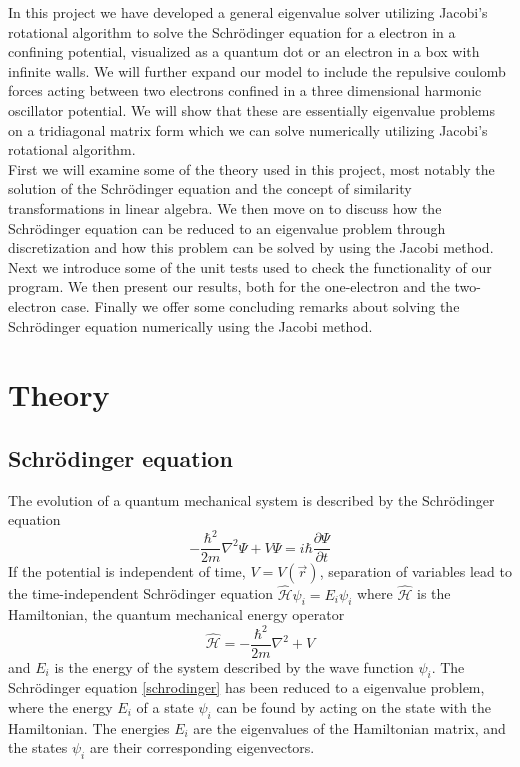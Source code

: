 \documentclass[12pt]{article}
\numberwithin{figure}{section}
\numberwithin{table}{section}
\begin{document}
\noindent In this project we have developed a general eigenvalue solver utilizing Jacobi's rotational algorithm to solve the Schrödinger equation for a electron in a confining potential, visualized as a quantum dot or an electron in a box with infinite walls. We will further expand our model to include the repulsive coulomb forces acting between two electrons confined in a three dimensional harmonic oscillator potential. We will show that these are essentially eigenvalue problems on a tridiagonal matrix form which we can solve numerically utilizing Jacobi's rotational algorithm.   \\

\noindent First we will examine some of the theory used in this project, most notably the solution of the Schrödinger equation and the concept of similarity transformations in linear algebra. We then move on to discuss how the Schrödinger equation can be reduced to an eigenvalue problem through discretization and how this problem can be solved by using the Jacobi method. Next we introduce some of the unit tests used to check the functionality of our program. We then present our results, both for the one-electron and the two-electron case. Finally we offer some concluding remarks about solving the Schrödinger equation numerically using the Jacobi method.

\section{Theory}

\subsection{Schrödinger equation}
\noindent The evolution of a quantum mechanical system is described by the Schrödinger equation \cite{Qm}
\begin{equation}
\label{schrodinger}
-\frac{\hbar^2}{2m}\nabla^2\Psi+V\Psi=i\hbar \frac{\partial \Psi}{\partial t}
\end{equation}
If the potential is independent of time, $V=V(\vec{r}) 
$, separation of variables lead to the time-independent Schrödinger equation  $\hat{\mathcal{H}} \psi_i = E_i \psi_i$ where $\hat{\mathcal{H}}$ is the Hamiltonian, the quantum mechanical energy operator
$$\hat{\mathcal{H}}=-\frac{\hbar^2}{2m}\nabla^2+V$$and $E_i$ is the energy of the system described by the wave function $\psi_i$. The Schrödinger equation \eqref{schrodinger} has been reduced to a eigenvalue problem, where the energy $E_i$ of a state $\psi_i$ can be found by acting on the state with the Hamiltonian. The energies $E_i$ are the eigenvalues of the Hamiltonian matrix, and the states $\psi_i$ are their corresponding eigenvectors.\\
\end{document}
